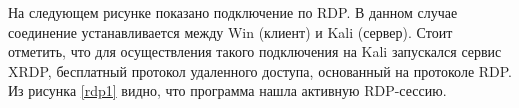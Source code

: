 \documentclass[bachelor, och, coursework]{SCWorks}
\begin{document}










На следующем рисунке показано подключение по RDP. В данном случае соединение устанавливается между Win (клиент) и Kali (сервер). 
Стоит отметить, что для осуществления такого подключения на Kali запускался сервис XRDP, бесплатный протокол 
удаленного доступа, основанный на протоколе RDP. Из рисунка \ref{rdp1} видно, что программа
нашла активную RDP-сессию.
\end{document}
